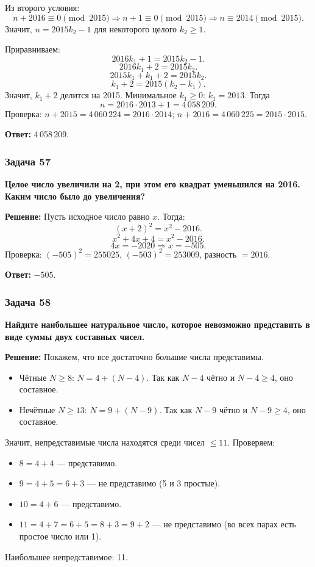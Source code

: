 \documentclass[12pt, a4paper]{article}
\begin{document}
Из второго условия:
\[
n + 2016 \equiv 0 \pmod{2015} \Rightarrow n + 1 \equiv 0 \pmod{2015} \Rightarrow n \equiv 2014 \pmod{2015}.
\]
Значит, $n = 2015k_2 - 1$ для некоторого целого $k_2 \ge 1$.

Приравниваем:
\[
2016k_1 + 1 = 2015k_2 - 1.
\]
\[
2016k_1 + 2 = 2015k_2.
\]
\[
2015k_1 + k_1 + 2 = 2015k_2.
\]
\[
k_1 + 2 = 2015(k_2 - k_1).
\]
Значит, $k_1 + 2$ делится на 2015. Минимальное $k_1 \ge 0$: $k_1 = 2013$. Тогда
\[
n = 2016 \cdot 2013 + 1 = 4\,058\,209.
\]
Проверка: $n + 2015 = 4\,060\,224 = 2016 \cdot 2014$; $n + 2016 = 4\,060\,225 = 2015 \cdot 2015$.

\textbf{Ответ:} 4\,058\,209.

\subsubsection*{Задача 57}
\textbf{Целое число увеличили на 2, при этом его квадрат уменьшился на 2016. Каким число было до увеличения?}

\textbf{Решение:}
Пусть исходное число равно $x$. Тогда:
\[
(x+2)^2 = x^2 - 2016.
\]
\[
x^2 + 4x + 4 = x^2 - 2016.
\]
\[
4x = -2020 \Rightarrow x = -505.
\]
Проверка: $(-505)^2 = 255025$, $(-503)^2 = 253009$, разность $= 2016$.

\textbf{Ответ:} $-505$.

\subsubsection*{Задача 58}
\textbf{Найдите наибольшее натуральное число, которое невозможно представить в виде суммы двух составных чисел.}

\textbf{Решение:}
Покажем, что все достаточно большие числа представимы.

\begin{itemize}
    \item Чётные $N \ge 8$: $N = 4 + (N-4)$. Так как $N-4$ чётно и $N-4 \ge 4$, оно составное.
    \item Нечётные $N \ge 13$: $N = 9 + (N-9)$. Так как $N-9$ чётно и $N-9 \ge 4$, оно составное.
\end{itemize}
Значит, непредставимые числа находятся среди чисел $\le 11$. Проверяем:
\begin{itemize}
    \item $8 = 4+4$ — представимо.
    \item $9 = 4+5 = 6+3$ — не представимо (5 и 3 простые).
    \item $10 = 4+6$ — представимо.
    \item $11 = 4+7 = 6+5 = 8+3 = 9+2$ — не представимо (во всех парах есть простое число или 1).
\end{itemize}
Наибольшее непредставимое: 11.
\end{document}
